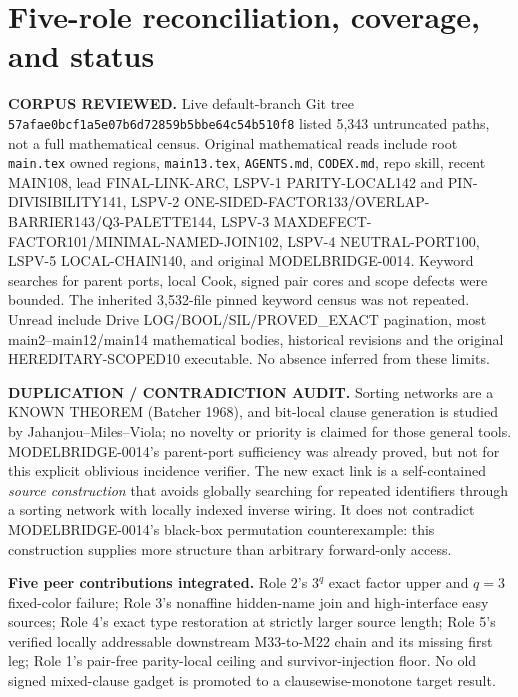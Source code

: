 \documentclass[11pt]{article}
\begin{document}
\section{Five-role reconciliation, coverage, and status}
\textbf{CORPUS REVIEWED.} Live default-branch Git tree \texttt{57afae0bcf1a5e07b6d72859b5bbe64c54b510f8} listed 5,343 untruncated paths, not a full mathematical census. Original mathematical reads include root \texttt{main.tex} owned regions, \texttt{main13.tex}, \texttt{AGENTS.md}, \texttt{CODEX.md}, repo skill, recent MAIN108, lead FINAL-LINK-ARC, LSPV-1 PARITY-LOCAL142 and PIN-DIVISIBILITY141, LSPV-2 ONE-SIDED-FACTOR133/OVERLAP-BARRIER143/Q3-PALETTE144, LSPV-3 MAXDEFECT-FACTOR101/MINIMAL-NAMED-JOIN102, LSPV-4 NEUTRAL-PORT100, LSPV-5 LOCAL-CHAIN140, and original MODELBRIDGE-0014. Keyword searches for parent ports, local Cook, signed pair cores and scope defects were bounded. The inherited 3,532-file pinned keyword census was not repeated. Unread include Drive LOG/BOOL/SIL/PROVED_EXACT pagination, most main2--main12/main14 mathematical bodies, historical revisions and the original HEREDITARY-SCOPED10 executable. No absence inferred from these limits.

\textbf{DUPLICATION / CONTRADICTION AUDIT.} Sorting networks are a KNOWN THEOREM (Batcher 1968), and bit-local clause generation is studied by Jahanjou--Miles--Viola; no novelty or priority is claimed for those general tools. MODELBRIDGE-0014's parent-port sufficiency was already proved, but not for this explicit oblivious incidence verifier. The new exact link is a self-contained \emph{source construction} that avoids globally searching for repeated identifiers through a sorting network with locally indexed inverse wiring. It does not contradict MODELBRIDGE-0014's black-box permutation counterexample: this construction supplies more structure than arbitrary forward-only access.

\textbf{Five peer contributions integrated.} Role 2's $3^q$ exact factor upper and $q=3$ fixed-color failure; Role 3's nonaffine hidden-name join and high-interface easy sources; Role 4's exact type restoration at strictly larger source length; Role 5's verified locally addressable downstream M33-to-M22 chain and its missing first leg; Role 1's pair-free parity-local ceiling and survivor-injection floor. No old signed mixed-clause gadget is promoted to a clausewise-monotone target result.
\end{document}
